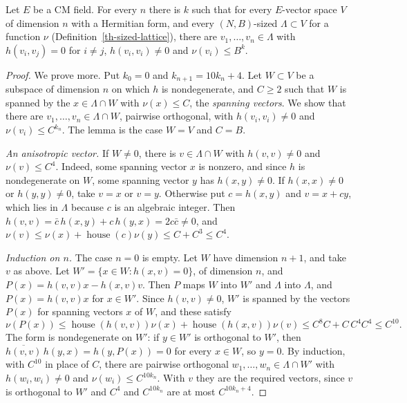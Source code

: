 \begin{lemma}\label{th-anisotropic-frame}
Let $E$ be a CM field. For every $n$ there is $k$ such that for every
$E$-vector space $V$ of dimension $n$ with a Hermitian form, and every
$(N,B)$-sized $\Lambda\subset V$ for a function $\nu$
(Definition~\ref{th-sized-lattice}), there are $v_1,\ldots,v_n\in\Lambda$ with
$h(v_i,v_j)=0$ for $i\neq j$, $h(v_i,v_i)\neq0$ and $\nu(v_i)\leq B^k$.
\end{lemma}
\begin{proof}
We prove more. Put $k_0=0$ and $k_{n+1}=10k_n+4$. Let $W\subset V$ be a subspace
of dimension $n$ on which $h$ is nondegenerate, and $C\geq2$ such that $W$ is
spanned by the $x\in\Lambda\cap W$ with $\nu(x)\leq C$, the \emph{spanning
vectors}. We show that there are $v_1,\ldots,v_n\in\Lambda\cap W$, pairwise
orthogonal, with $h(v_i,v_i)\neq0$ and $\nu(v_i)\leq C^{k_n}$. The lemma is the
case $W=V$ and $C=B$.

\emph{An anisotropic vector.} If $W\neq0$, there is $v\in\Lambda\cap W$ with
$h(v,v)\neq0$ and $\nu(v)\leq C^4$. Indeed, some spanning vector $x$ is nonzero,
and since $h$ is nondegenerate on $W$, some spanning vector $y$ has
$h(x,y)\neq0$. If $h(x,x)\neq0$ or $h(y,y)\neq0$, take $v=x$ or $v=y$.
Otherwise put $c=h(x,y)$ and $v=x+cy$, which lies in $\Lambda$ because $c$ is an
algebraic integer. Then $h(v,v)=\bar c\,h(x,y)+c\,h(y,x)=2c\bar c\neq0$, and
$\nu(v)\leq\nu(x)+\operatorname{house}(c)\nu(y)\leq C+C^3\leq C^4$.

\emph{Induction on $n$.} The case $n=0$ is empty. Let $W$ have dimension $n+1$,
and take $v$ as above. Let $W'=\{x\in W:h(x,v)=0\}$, of dimension $n$, and
$P(x)=h(v,v)x-h(x,v)v$. Then $P$ maps $W$ into $W'$ and $\Lambda$ into
$\Lambda$, and $P(x)=h(v,v)x$ for $x\in W'$. Since $h(v,v)\neq0$, $W'$ is spanned
by the vectors $P(x)$ for spanning vectors $x$ of $W$, and these satisfy
\[
\nu(P(x))\leq\operatorname{house}(h(v,v))\nu(x)+\operatorname{house}(h(x,v))\nu(v)
\leq C^8C+C\,C^4C^4\leq C^{10}.
\]
The form is nondegenerate on $W'$: if $y\in W'$ is orthogonal to $W'$, then
$\overline{h(v,v)}\,h(y,x)=h(y,P(x))=0$ for every $x\in W$, so $y=0$. By
induction, with $C^{10}$ in place of $C$, there are pairwise orthogonal
$w_1,\ldots,w_n\in\Lambda\cap W'$ with $h(w_i,w_i)\neq0$ and
$\nu(w_i)\leq C^{10k_n}$. With $v$ they are the required vectors, since $v$ is
orthogonal to $W'$ and $C^4$ and $C^{10k_n}$ are at most $C^{10k_n+4}$.
\end{proof}

